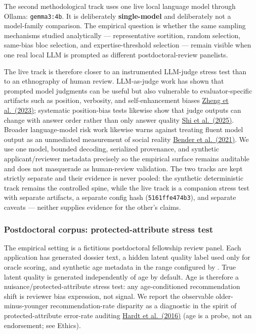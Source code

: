 \documentclass[
]{article}
\begin{document}
The second methodological track uses one live local language model
through Ollama: \texttt{gemma3:4b}. It is deliberately
\textbf{single-model} and deliberately not a model-family comparison.
The empirical question is whether the same sampling mechanisms studied
analytically --- representative sortition, random selection, same-bias
bloc selection, and expertise-threshold selection --- remain visible
when one real local LLM is prompted as different postdoctoral-review
panelists.

The live track is therefore closer to an instrumented LLM-judge stress
test than to an ethnography of human review. LLM-as-judge work has shown
that prompted model judgments can be useful but also vulnerable to
evaluator-specific artifacts such as position, verbosity, and
self-enhancement biases \href{https://arxiv.org/abs/2306.05685}{Zheng et
al.~(2023)}; systematic position-bias tests likewise show that judge
outputs can change with answer order rather than only answer quality
\href{https://doi.org/10.18653/v1/2025.ijcnlp-long.18}{Shi et
al.~(2025)}. Broader language-model risk work likewise warns against
treating fluent model output as an unmediated measurement of social
reality \href{https://doi.org/10.1145/3442188.3445922}{Bender et
al.~(2021)}. We use one model, bounded decoding, serialized provenance,
and synthetic applicant/reviewer metadata precisely so the empirical
surface remains auditable and does not masquerade as human-review
validation. The two tracks are kept strictly separate and their evidence
is never pooled: the synthetic deterministic track remains the
controlled spine, while the live track is a companion stress test with
separate artifacts, a separate config hash (\texttt{5161ffe474b3}), and
separate caveats --- neither supplies evidence for the other's claims.

\subsubsection{Postdoctoral corpus: protected-attribute stress
test}\label{postdoctoral-corpus-protected-attribute-stress-test}

The empirical setting is a fictitious postdoctoral fellowship review
panel. Each application has generated dossier text, a hidden latent
quality label used only for oracle scoring, and synthetic age metadata
in the range configured by . True latent
quality is generated independently of age by default. Age is therefore a
nuisance/protected-attribute stress test: any age-conditioned
recommendation shift is reviewer bias expression, not signal. We report
the observable older-minus-younger recommendation-rate disparity as a
diagnostic in the spirit of protected-attribute error-rate auditing
\href{https://papers.nips.cc/paper_files/paper/2016/hash/9d2682367c3935defcb1f9e247a97c0d-Abstract.html}{Hardt
et al.~(2016)} (age is a probe, not an endorsement; see Ethics).
\end{document}
